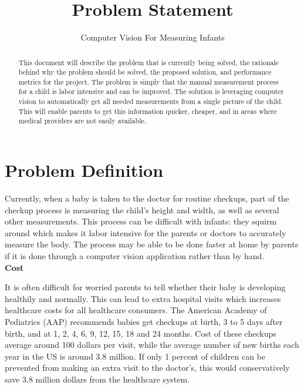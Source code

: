 \documentclass[10pt, draftclsnofoot, letterpaper, margin=.75in, onecolumn]{IEEEtran}
\begin{document}
\renewcommand{\familydefault}{\sfdefault}

\title{Problem Statement}
\author{
Computer Vision For Measuring Infants}


\begin{titlepage}
\maketitle
\begin{abstract}
\noindent This document will describe the problem that is currently being solved, the rationale behind why the problem should be solved, the proposed solution, and performance metrics for the project. The problem is simply that the manual measurement process for a child is labor intensive and can be improved. The solution is leveraging computer vision to automatically get all needed measurements from a single picture of the child. This will enable parents to get this information quicker, cheaper, and in areas where medical providers are not easily available.
\end{abstract}

\end{titlepage}


\section{Problem Definition}
\par \noindent Currently, when a baby is taken to the doctor for routine checkups, part of the checkup process is measuring the child's height and width, as well as several other measurements. This process can be difficult with infants: they squirm around which makes it labor intensive for the parents or doctors to accurately measure the body. The process may be able to be done faster at home by parents if it is done through a computer vision application rather than by hand.\\

\textbf{Cost}
\par \noindent It is often difficult for worried parents to tell whether their baby is developing healthily and normally. This can lead to extra hospital visits which increases healthcare costs for all healthcare consumers. The American Academy of Pediatrics (AAP) recommends babies get checkups at birth, 3 to 5 days after birth, and at 1, 2, 4, 6, 9, 12, 15, 18 and 24 months\cite{checkup}. Cost of these checkups average around 100 dollars per visit\cite{cost}, while the average number of new births each year in the US is around 3.8 million\cite{births}. If only 1 percent of children can be prevented from making an extra visit to the doctor's, this would conservatively save 3.8 million dollars from the healthcare system.\\
\end{document}
